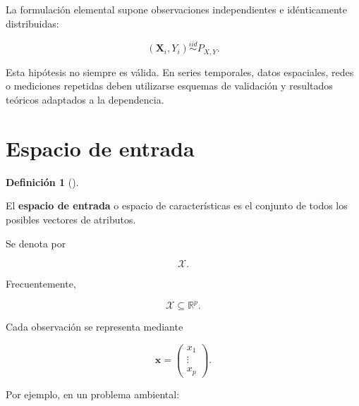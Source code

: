 \documentclass[
  spanish,
  10.5pt,
  letterpaper,
  DIV=11,
  numbers=noendperiod,
  oneside,
  open=any]{scrreprt}
\theoremstyle{definition}
\newtheorem{definition}{Definición}[chapter]
\theoremstyle{definition}
\theoremstyle{plain}
\theoremstyle{remark}
\begin{document}
\begin{tcolorbox}[enhanced jigsaw, arc=.35mm, bottomrule=.15mm, bottomtitle=1mm, breakable, colback=white, colbacktitle=quarto-callout-important-color!10!white, colframe=quarto-callout-important-color-frame, coltitle=black, left=2mm, leftrule=.75mm, opacityback=0, opacitybacktitle=0.6, rightrule=.15mm, title=\textcolor{quarto-callout-important-color}{\faExclamation}\hspace{0.5em}{Hipótesis de muestreo}, titlerule=0mm, toprule=.15mm, toptitle=1mm]

La formulación elemental supone observaciones independientes e
idénticamente distribuidas:

\[
(\mathbf{X}_i,Y_i)\overset{iid}{\sim}P_{X,Y}.
\]

Esta hipótesis no siempre es válida. En series temporales, datos
espaciales, redes o mediciones repetidas deben utilizarse esquemas de
validación y resultados teóricos adaptados a la dependencia.

\end{tcolorbox}

\section*{Espacio de entrada}\label{espacio-de-entrada}


\begin{definition}[]\protect\hypertarget{def-espacio-entrada}{}\label{def-espacio-entrada}

El \textbf{espacio de entrada} o espacio de características es el
conjunto de todos los posibles vectores de atributos.

\end{definition}

Se denota por

\[
\mathcal{X}.
\]

Frecuentemente,

\[
\mathcal{X}\subseteq\mathbb{R}^{p}.
\]

Cada observación se representa mediante

\[
\mathbf{x}
=
\begin{pmatrix}
x_1\\
\vdots\\
x_p
\end{pmatrix}.
\]

Por ejemplo, en un problema ambiental:
\end{document}
